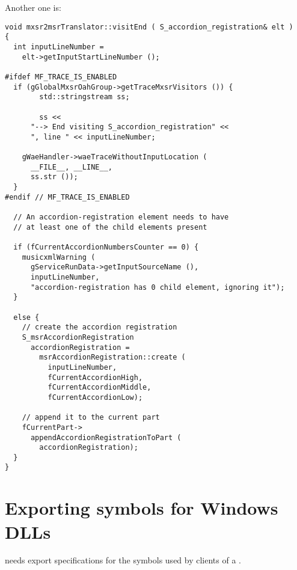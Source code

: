 Another one is:
\begin{lstlisting}[language=CPlusPlus]
void mxsr2msrTranslator::visitEnd ( S_accordion_registration& elt )
{
  int inputLineNumber =
    elt->getInputStartLineNumber ();

#ifdef MF_TRACE_IS_ENABLED
  if (gGlobalMxsrOahGroup->getTraceMxsrVisitors ()) {
		std::stringstream ss;

		ss <<
      "--> End visiting S_accordion_registration" <<
      ", line " << inputLineNumber;

    gWaeHandler->waeTraceWithoutInputLocation (
      __FILE__, __LINE__,
      ss.str ());
  }
#endif // MF_TRACE_IS_ENABLED

  // An accordion-registration element needs to have
  // at least one of the child elements present

  if (fCurrentAccordionNumbersCounter == 0) {
    musicxmlWarning (
      gServiceRunData->getInputSourceName (),
      inputLineNumber,
      "accordion-registration has 0 child element, ignoring it");
  }

  else {
    // create the accordion registration
    S_msrAccordionRegistration
      accordionRegistration =
        msrAccordionRegistration::create (
          inputLineNumber,
          fCurrentAccordionHigh,
          fCurrentAccordionMiddle,
          fCurrentAccordionLow);

    // append it to the current part
    fCurrentPart->
      appendAccordionRegistrationToPart (
        accordionRegistration);
  }
}
\end{lstlisting}


\section{Exporting symbols for Windows DLLs}

 needs export specifications for the symbols used by clients of a .

